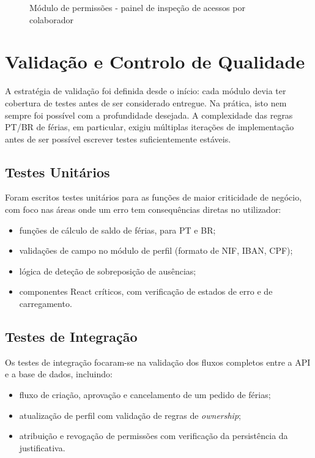 \documentclass[12pt, a4paper, twoside, openright]{report}
\begin{document}
\begin{figure}[H]
  \centering
  \caption{Módulo de permissões - painel de inspeção de acessos por colaborador}
  \label{fig:permissoes}
\end{figure}

\section{Validação e Controlo de Qualidade}

A estratégia de validação foi definida desde o início: cada módulo devia ter cobertura
de testes antes de ser considerado entregue. Na prática, isto nem sempre foi possível
com a profundidade desejada. A complexidade das regras PT/BR de férias, em particular,
exigiu múltiplas iterações de implementação antes de ser possível escrever testes
suficientemente estáveis.

\subsection{Testes Unitários}

Foram escritos testes unitários para as funções de maior criticidade de negócio,
com foco nas áreas onde um erro tem consequências diretas no utilizador:

\begin{itemize}
  \item funções de cálculo de saldo de férias, para PT e BR;
  \item validações de campo no módulo de perfil (formato de NIF, IBAN, CPF);
  \item lógica de deteção de sobreposição de ausências;
  \item componentes React críticos, com verificação de estados de erro e de carregamento.
\end{itemize}

\subsection{Testes de Integração}

Os testes de integração focaram-se na validação dos fluxos completos entre a API
e a base de dados, incluindo:

\begin{itemize}
  \item fluxo de criação, aprovação e cancelamento de um pedido de férias;
  \item atualização de perfil com validação de regras de \textit{ownership};
  \item atribuição e revogação de permissões com verificação da persistência
        da justificativa.
\end{itemize}
\end{document}
